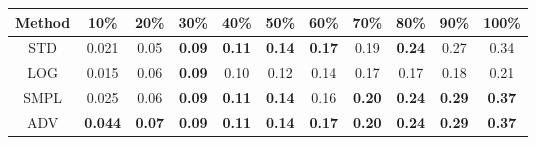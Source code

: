 \documentclass{standalone}
\begin{document}
\begin{tabular}{c|cccccccccc}
      \toprule
      Method & 10\% & 20\% & 30\% & 40\% & 50\% & 60\% & 70\% & 80\% & 90\% & 100\% \\
      \midrule
STD & 0.021 & 0.05 & \textbf{0.09} & \textbf{0.11} & \textbf{0.14} & \textbf{0.17} & 0.19 & \textbf{0.24} & 0.27 & 0.34\\
LOG & 0.015 & 0.06 & \textbf{0.09} & 0.10 & 0.12 & 0.14 & 0.17 & 0.17 & 0.18 & 0.21\\
SMPL & 0.025 & 0.06 & \textbf{0.09} & \textbf{0.11} & \textbf{0.14} & 0.16 & \textbf{0.20} & \textbf{0.24} & \textbf{0.29} & \textbf{0.37}\\
ADV & \textbf{0.044} & \textbf{0.07} & \textbf{0.09} & \textbf{0.11} & \textbf{0.14} & \textbf{0.17} & \textbf{0.20} & \textbf{0.24} & \textbf{0.29} & \textbf{0.37}\\
  \bottomrule
\end{tabular}
\end{document}
